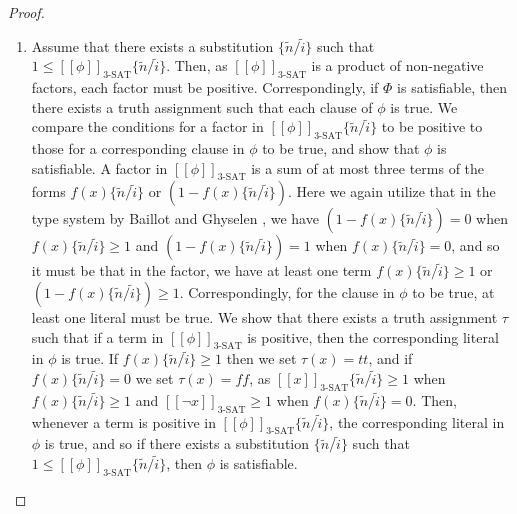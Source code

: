 \begin{lemma}
\begin{proof}
\begin{enumerate}
    \item Assume that there exists a substitution $\{\widetilde{n}/\widetilde{i}\}$ such that $1 \leq [\![\phi]\!]_{\text{3-SAT}}\{\widetilde{n}/\widetilde{i}\}$. Then, as $[\![\phi]\!]_{\text{3-SAT}}$ is a product of non-negative factors, each factor must be positive. Correspondingly, if $\Phi$ is satisfiable, then there exists a truth assignment such that each clause of $\phi$ is true. We compare the conditions for a factor in $[\![\phi]\!]_{\text{3-SAT}}\{\widetilde{n}/\widetilde{i}\}$ to be positive to those for a corresponding clause in $\phi$ to be true, and show that $\phi$ is satisfiable. A factor in $[\![\phi]\!]_{\text{3-SAT}}$ is a sum of at most three terms of the forms $f(x)\{\widetilde{n}/\widetilde{i}\}$ or $(1 - f(x)\{\widetilde{n}/\widetilde{i}\})$. Here we again utilize that in the type system by Baillot and Ghyselen \cite{BaillotGhyselen2021}, we have $(1 - f(x)\{\widetilde{n}/\widetilde{i}\}) = 0$ when $f(x)\{\widetilde{n}/\widetilde{i}\} \geq 1$ and $(1 - f(x)\{\widetilde{n}/\widetilde{i}\}) = 1$ when $f(x)\{\widetilde{n}/\widetilde{i}\} = 0$, and so it must be that in the factor, we have at least one term $f(x)\{\widetilde{n}/\widetilde{i}\} \geq 1$ or $(1 - f(x)\{\widetilde{n}/\widetilde{i}\}) \geq 1$. Correspondingly, for the clause in $\phi$ to be true, at least one literal must be true. We show that there exists a truth assignment $\tau$ such that if a term in $[\![\phi]\!]_{\text{3-SAT}}$ is positive, then the corresponding literal in $\phi$ is true. If $f(x)\{\widetilde{n}/\widetilde{i}\}\geq 1$ then we set $\tau(x) = tt$, and if $f(x)\{\widetilde{n}/\widetilde{i}\} = 0$ we set $\tau(x) = f\!f$, as $[\![x]\!]_{\text{3-SAT}}\{\widetilde{n}/\widetilde{i}\} \geq 1$ when $f(x)\{\widetilde{n}/\widetilde{i}\} \geq 1$ and $[\![\neg x]\!]_{\text{3-SAT}} \geq 1$ when $f(x)\{\widetilde{n}/\widetilde{i}\}=0$. Then, whenever a term is positive in $[\![\phi]\!]_{\text{3-SAT}}\{\widetilde{n}/\widetilde{i}\}$, the corresponding literal in $\phi$ is true, and so if there exists a substitution $\{\widetilde{n}/\widetilde{i}\}$ such that $1 \leq [\![\phi]\!]_{\text{3-SAT}}\{\widetilde{n}/\widetilde{i}\}$, then $\phi$ is satisfiable.
    
\end{enumerate}
\end{proof}
\end{lemma}



